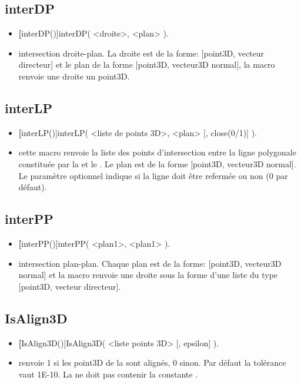 \subsection{interDP}
\begin{itemize}
 \item \util \textbf[interDP()]{interDP( <droite>, <plan> )}.
 \item \desc intersection droite-plan. La droite est de la forme: [point3D, vecteur directeur] et le plan de la forme [point3D, vecteur3D normal], la macro renvoie une droite un point3D.
\end{itemize}

\subsection{interLP}
\begin{itemize}
 \item \util \textbf[interLP()]{interLP( <liste de points 3D>, <plan> [, close(0/1)] )}.
 \item \desc cette macro renvoie la liste des points d'intersection entre la ligne polygonale constituée par la  et le . Le plan est de la forme [point3D, vecteur3D normal]. Le paramètre optionnel  indique si la ligne doit être refermée ou non ($0$ par défaut).
\end{itemize}

\subsection{interPP}
\begin{itemize}
 \item \util \textbf[interPP()]{interPP( <plan1>, <plan1> )}.
 \item \desc intersection plan-plan. Chaque plan est de la forme: [point3D, vecteur3D normal] et la macro renvoie une droite sous la forme d'une liste du type [point3D, vecteur directeur].
\end{itemize}

\subsection{IsAlign3D}
\begin{itemize}
 \item \util \textbf[IsAlign3D()]{IsAlign3D( <liste points 3D> [, epsilon] )}.
 \item \desc renvoie 1 si les point3D de la  sont alignés, 0 sinon. Par défaut la tolérance  vaut 1E-10. La  ne doit pas contenir la constante \jump.
\end{itemize}

